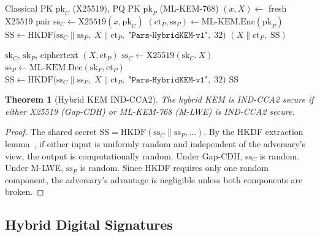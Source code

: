 \documentclass[11pt,a4paper]{article}
\newtheorem{theorem}{Theorem}[section]
\begin{document}
\begin{algorithm}[H]
\caption{Hybrid KEM: Encapsulate}
\label{alg:hybrid-enc}
\begin{algorithmic}[1]
\Require Classical PK $\mathrm{pk}_C$ (X25519), PQ PK $\mathrm{pk}_P$
    (ML-KEM-768)
\State $(x, X) \gets$ fresh X25519 pair
\State $\mathrm{ss}_C \gets \mathrm{X25519}(x, \mathrm{pk}_C)$
\State $(\mathrm{ct}_P, \mathrm{ss}_P) \gets
    \mathrm{ML\text{-}KEM.Enc}(\mathrm{pk}_P)$
\State $\mathrm{SS} \gets \mathrm{HKDF}\bigl(
    \mathrm{ss}_C \| \mathrm{ss}_P,\;
    X \| \mathrm{ct}_P,\;
    \texttt{"Pars-HybridKEM-v1"},\; 32\bigr)$
\State \Return $(X \| \mathrm{ct}_P,\;\mathrm{SS})$
\end{algorithmic}
\end{algorithm}

\begin{algorithm}[H]
\caption{Hybrid KEM: Decapsulate}
\label{alg:hybrid-dec}
\begin{algorithmic}[1]
\Require $\mathrm{sk}_C$, $\mathrm{sk}_P$, ciphertext $(X, \mathrm{ct}_P)$
\State $\mathrm{ss}_C \gets \mathrm{X25519}(\mathrm{sk}_C, X)$
\State $\mathrm{ss}_P \gets
    \mathrm{ML\text{-}KEM.Dec}(\mathrm{sk}_P, \mathrm{ct}_P)$
\State $\mathrm{SS} \gets \mathrm{HKDF}\bigl(
    \mathrm{ss}_C \| \mathrm{ss}_P,\;
    X \| \mathrm{ct}_P,\;
    \texttt{"Pars-HybridKEM-v1"},\; 32\bigr)$
\State \Return SS
\end{algorithmic}
\end{algorithm}

\begin{theorem}[Hybrid KEM IND-CCA2]
    \label{thm:hybrid-kem}
    The hybrid KEM is IND-CCA2 secure if either X25519 (Gap-CDH) or
    ML-KEM-768 (M-LWE) is IND-CCA2 secure.
\end{theorem}

\begin{proof}
    The shared secret $\mathrm{SS} = \mathrm{HKDF}(\mathrm{ss}_C \|
    \mathrm{ss}_P, \ldots)$.  By the HKDF extraction
    lemma~\cite{krawczyk2010hkdf}, if either input is uniformly random and
    independent of the adversary's view, the output is computationally
    random.  Under Gap-CDH, $\mathrm{ss}_C$ is random.  Under M-LWE,
    $\mathrm{ss}_P$ is random.  Since HKDF requires only one random
    component, the adversary's advantage is negligible unless both
    components are broken.
\end{proof}

\subsection{Hybrid Digital Signatures}
\end{document}
